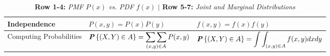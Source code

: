 \begin{table}[ht]
\begin{tabular}{|l|l|l|}
  \hline
  Independence                            & $P(x, y) = P(x)P(y)$                                        & $f(x, y) = f(x) f(y)$                                           \\ 
  \hline
  Computing
  Probabilities                 & $\begin{aligned}\textbf{\textit{P}}\left\{(X, Y) \in A \right\} = \mathop{\sum\sum}_{(x, y) \in A} P(x, y)\end{aligned}$ & $\begin{aligned}\textbf{\textit{P}}\left\{(X, Y) \in A\right\} = \int \int_{(x, y) \in A} f(x, y) dx dy\end{aligned}$  \\
  \hline
  \end{tabular}
  \caption{\textbf{Row 1-4:} \textit{PMF $P(x)$ vs. PDF $f(x)$} $|$ \textbf{Row 5-7:} \textit{Joint and Marginal Distributions}}
\end{table}

